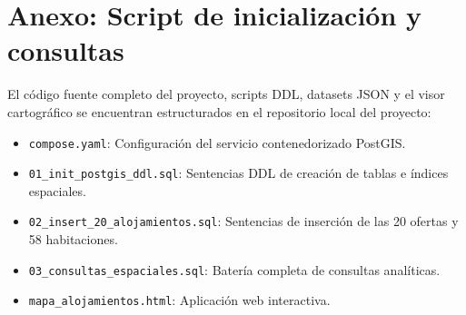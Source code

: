 \documentclass[a4paper,12pt]{article}
\begin{document}
\appendix
\section{Anexo: Script de inicialización y consultas}

El código fuente completo del proyecto, scripts DDL, datasets JSON y el visor cartográfico se encuentran estructurados en el repositorio local del proyecto:
\begin{itemize}[leftmargin=1.0cm]
  \item \texttt{compose.yaml}: Configuración del servicio contenedorizado PostGIS.
  \item \texttt{01\_init\_postgis\_ddl.sql}: Sentencias DDL de creación de tablas e índices espaciales.
  \item \texttt{02\_insert\_20\_alojamientos.sql}: Sentencias de inserción de las 20 ofertas y 58 habitaciones.
  \item \texttt{03\_consultas\_espaciales.sql}: Batería completa de consultas analíticas.
  \item \texttt{mapa\_alojamientos.html}: Aplicación web interactiva.
\end{itemize}
\end{document}
